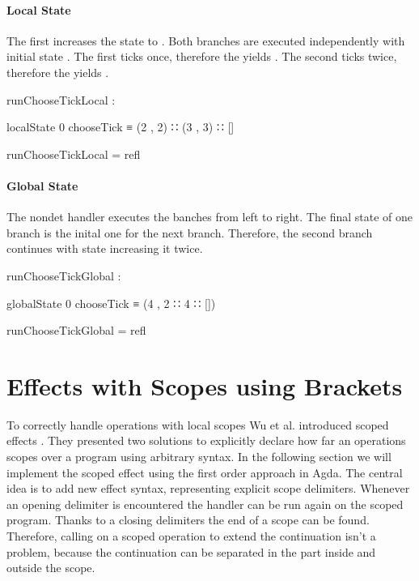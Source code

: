 \paragraph{Local State}
The first  increases the state to .
Both branches are executed independently with initial state .
The first ticks once, therefore the  yields .
The second ticks twice, therefore the  yields .

\begin{center}
\begin{code}
runChooseTickLocal :
\end{code}
\begin{code}[inline]
 localState 0 chooseTick ≡ (2 , 2) ∷ (3 , 3) ∷ []
\end{code}
\begin{code}
runChooseTickLocal = refl
\end{code}
\end{center}

\paragraph{Global State}
The nondet handler executes the banches from left to right.
The final state of one branch is the inital one for the next branch.
Therefore, the second branch continues with state  increasing it
twice.

\begin{center}
\begin{code}
runChooseTickGlobal :
\end{code}
\begin{code}[inline]
 globalState 0 chooseTick ≡ (4 , 2 ∷ 4 ∷ [])
\end{code}
\begin{code}
runChooseTickGlobal = refl
\end{code}
\end{center}


\section{Effects with Scopes using Brackets}

To correctly handle operations with local scopes Wu et al. introduced scoped
effects \cite{DBLP:conf/haskell/WuSH14}.
They presented two solutions to explicitly declare how far an operations scopes
over a program using arbitrary syntax.
In the following section we will implement the scoped effect
 using the first order approach in Agda.
The central idea is to add new effect syntax, representing explicit scope
delimiters.
Whenever an opening delimiter is encountered the handler can be run again on the
scoped program.
Thanks to a closing delimiters the end of a scope can be found.
Therefore, calling \AgdaFunction{>>=} on a scoped operation to extend the
continuation isn't a problem, because the continuation can be separated in the
part inside and outside the scope.

